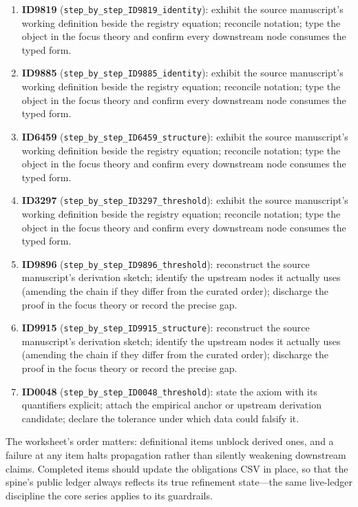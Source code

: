 \documentclass[11pt]{article}
\theoremstyle{remark}
\begin{document}
\begin{enumerate}
\item \textbf{ID9819} (\texttt{step\_by\_step\_ID9819\_identity}): exhibit the source manuscript's working definition beside the registry equation; reconcile notation; type the object in the focus theory and confirm every downstream node consumes the typed form.
\item \textbf{ID9885} (\texttt{step\_by\_step\_ID9885\_identity}): exhibit the source manuscript's working definition beside the registry equation; reconcile notation; type the object in the focus theory and confirm every downstream node consumes the typed form.
\item \textbf{ID6459} (\texttt{step\_by\_step\_ID6459\_structure}): exhibit the source manuscript's working definition beside the registry equation; reconcile notation; type the object in the focus theory and confirm every downstream node consumes the typed form.
\item \textbf{ID3297} (\texttt{step\_by\_step\_ID3297\_threshold}): exhibit the source manuscript's working definition beside the registry equation; reconcile notation; type the object in the focus theory and confirm every downstream node consumes the typed form.
\item \textbf{ID9896} (\texttt{step\_by\_step\_ID9896\_threshold}): reconstruct the source manuscript's derivation sketch; identify the upstream nodes it actually uses (amending the chain if they differ from the curated order); discharge the proof in the focus theory or record the precise gap.
\item \textbf{ID9915} (\texttt{step\_by\_step\_ID9915\_structure}): reconstruct the source manuscript's derivation sketch; identify the upstream nodes it actually uses (amending the chain if they differ from the curated order); discharge the proof in the focus theory or record the precise gap.
\item \textbf{ID0048} (\texttt{step\_by\_step\_ID0048\_threshold}): state the axiom with its quantifiers explicit; attach the empirical anchor or upstream derivation candidate; declare the tolerance under which data could falsify it.
\end{enumerate}

The worksheet's order matters: definitional items unblock derived ones, and a failure at any item halts propagation rather than silently weakening downstream claims. Completed items should update the obligations CSV in place, so that the spine's public ledger always reflects its true refinement state---the same live-ledger discipline the core series applies to its guardrails.
\end{document}
